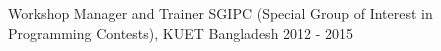\begin{cventries}
 \cventry
    {Workshop Manager and Trainer} %
    {SGIPC (Special Group of Interest in Programming Contests), KUET} %
    {Bangladesh} %
    {2012 - 2015} %
    {}
    {}

 \vspace*{-3mm}
    
\end{cventries}
